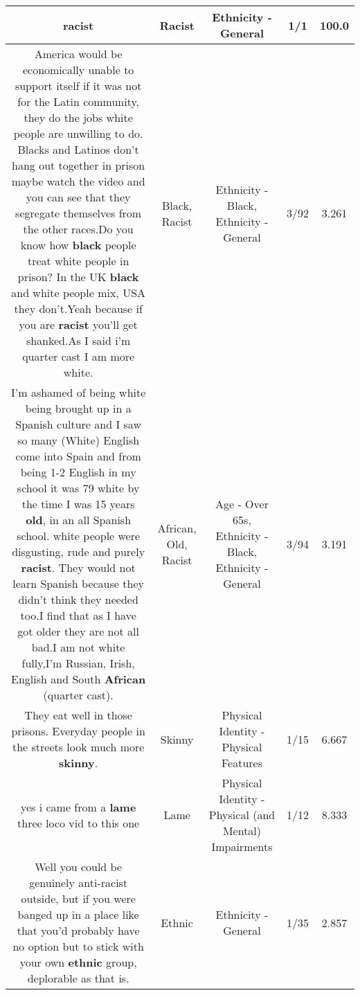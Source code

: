\documentclass[11pt]{article}
\newlength\mylength
\begin{document}
\begin{center}
\begin{longtable}{|C{.65\mylength}|C{.30\mylength}|C{.12\mylength}|C{.12\mylength}|C{.12\mylength}|}
  \small racist\normalsize   & Racist & Ethnicity - General & 1/1 & 100.0 \\  \hline
  \small America would be economically unable to support itself if it was not for the Latin community, they do the jobs white people are unwilling to do. Blacks and Latinos don't hang out together in prison maybe watch the video and you can see that they segregate themselves from the other races.Do you know how \textbf{black} people treat white people in prison? In the UK \textbf{black} and white people mix, USA they don't.Yeah because if you are \textbf{racist} you'll get shanked.As I said i'm quarter cast I am more white.\normalsize   & Black, Racist & Ethnicity - Black, Ethnicity - General & 3/92 & 3.261 \\  \hline
  \small I'm ashamed of being white being brought up in a Spanish culture and I saw so many (White) English come into Spain and from being 1-2 English in my school it was 79 white by the time I was 15 years \textbf{old}, in an all Spanish school. white people were disgusting, rude and purely \textbf{racist}. They would not learn Spanish because they didn't think they needed too.I find that as I have got older they are not all bad.I am not white fully,I'm Russian, Irish, English and South \textbf{African} (quarter cast).\normalsize   & African, Old, Racist & Age - Over 65s, Ethnicity - Black, Ethnicity - General & 3/94 & 3.191 \\  \hline
  \small They eat well in those prisons. Everyday people in the streets look much more \textbf{skinny}.\normalsize   & Skinny & Physical Identity - Physical Features & 1/15 & 6.667 \\  \hline
  \small yes i came from a \textbf{lame} three loco vid to this one\normalsize   & Lame & Physical Identity - Physical (and Mental) Impairments & 1/12 & 8.333 \\  \hline
  \small Well you could be genuinely anti-racist outside, but if you were banged up in a place like that you'd probably have no option but to stick with your own \textbf{ethnic} group, deplorable as that is.\normalsize   & Ethnic & Ethnicity - General & 1/35 & 2.857 \\  \hline

\end{longtable}
\end{center}
\end{document}
